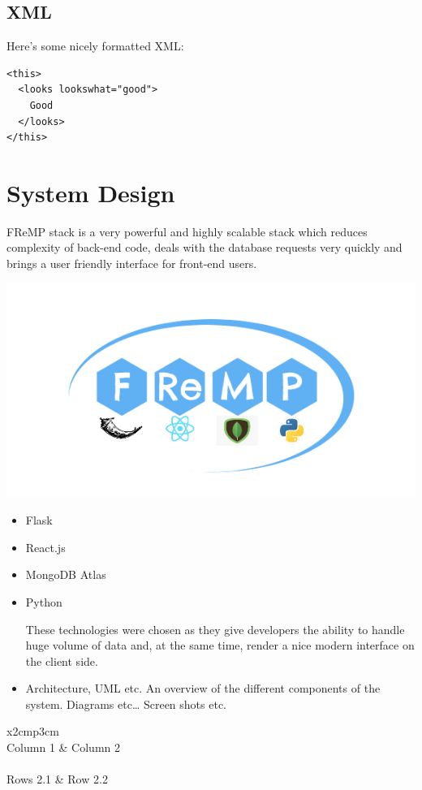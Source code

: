 \section{XML}
Here's some nicely formatted XML:
\begin{verbatim}
<this>
  <looks lookswhat="good">
    Good
  </looks>
</this>
\end{verbatim}

\chapter{System Design}
FReMP stack is a very powerful and highly scalable stack which reduces complexity of back-end code, deals with the database requests very quickly and brings a user friendly interface for front-end users.

\begin{center}    
      \includegraphics{img/fremp.PNG}
\end{center}

\begin{itemize}
\item Flask
\item React.js
\item MongoDB Atlas
\item Python

These technologies were chosen as they give developers the ability to handle huge volume of data and, at the same time, render a nice modern interface on the client side. 
\item Architecture, UML etc. An overview of the different components of the system. Diagrams etc… Screen shots etc.
\end{itemize}

\begin{table}[h]
  \centering
  \begin{tabular}{x{2cm}p{3cm}}
    \toprule \\
    Column 1 & Column 2 \\
    \midrule \\
    Rows 2.1 & Row 2.2 \\
    \bottomrule
  \end{tabular}
  \caption{A table.}
  \label{table:mytable}
\end{table}

